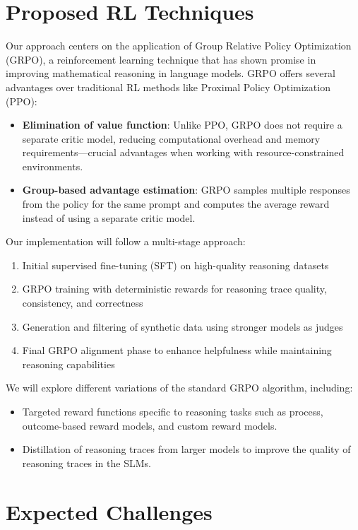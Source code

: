 \documentclass[11pt, oneside]{article}   	%
\begin{document}
\section*{Proposed RL Techniques}

Our approach centers on the application of Group Relative Policy Optimization (GRPO), a reinforcement learning technique that has shown promise in improving mathematical reasoning in language models. GRPO offers several advantages over traditional RL methods like Proximal Policy Optimization (PPO):

\begin{itemize}
	\item \textbf{Elimination of value function}: Unlike PPO, GRPO does not require a separate critic model, reducing computational overhead and memory requirements—crucial advantages when working with resource-constrained environments.

	\item \textbf{Group-based advantage estimation}: GRPO samples multiple responses from the policy for the same prompt and computes the average reward instead of using a separate critic model.
\end{itemize}

Our implementation will follow a multi-stage approach:
\begin{enumerate}
	\item Initial supervised fine-tuning (SFT) on high-quality reasoning datasets
	\item GRPO training with deterministic rewards for reasoning trace quality, consistency, and correctness
	\item Generation and filtering of synthetic data using stronger models as judges
	\item Final GRPO alignment phase to enhance helpfulness while maintaining reasoning capabilities
\end{enumerate}

We will explore different variations of the standard GRPO algorithm, including:
\begin{itemize}
	\item Targeted reward functions specific to reasoning tasks such as process, outcome-based reward models, and custom reward models.
	\item Distillation of reasoning traces from larger models to improve the quality of reasoning traces in the SLMs.
\end{itemize}

\section*{Expected Challenges}
\end{document}
